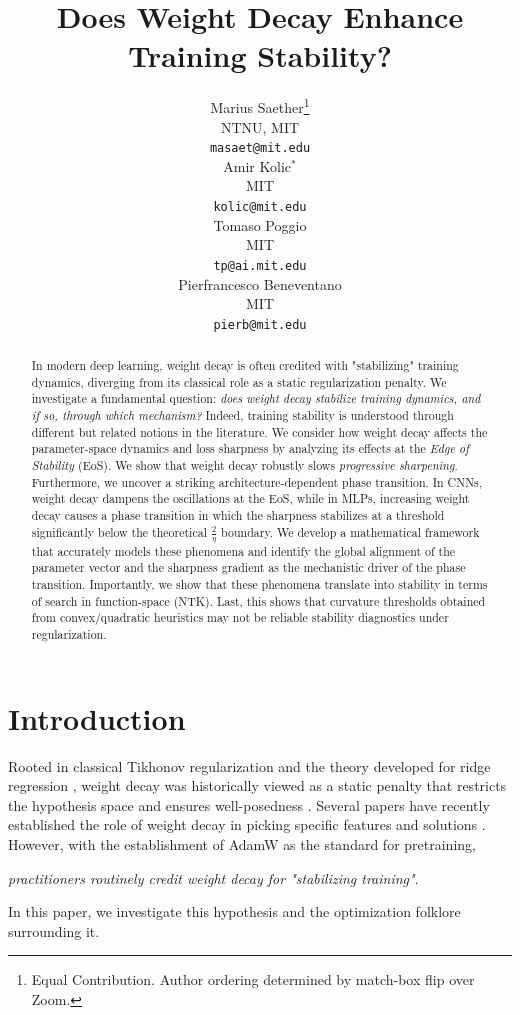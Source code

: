 \documentclass{article}
\title{Does Weight Decay Enhance Training Stability?}
\author{%
  Marius Saether\thanks{Equal Contribution. Author ordering determined by match-box flip over Zoom.}\\
  NTNU, MIT\\
  \texttt{masaet@mit.edu}\\
  \And
  Amir Kolic$^*$\\
  MIT\\
  \texttt{kolic@mit.edu}\\
  \And
  Tomaso Poggio \\
  MIT\\
  \texttt{tp@ai.mit.edu}\\
  \And
  Pierfrancesco Beneventano\\
  MIT\\
  \texttt{pierb@mit.edu}\\
}
\begin{document}
\maketitle

\begin{abstract}
In modern deep learning, weight decay is often credited with "stabilizing" training dynamics, diverging from its classical role as a static regularization penalty. We investigate a fundamental question: \emph{does weight decay stabilize training dynamics, and if so, through which mechanism?} Indeed, training stability is understood through different but related notions in the literature. We consider how weight decay affects the parameter-space dynamics and loss sharpness by analyzing its effects at the \emph{Edge of Stability} (EoS). We show that weight decay robustly slows \emph{progressive sharpening}. Furthermore, we uncover a striking architecture-dependent phase transition. In CNNs, weight decay dampens the oscillations at the EoS, while in MLPs, increasing weight decay causes a phase transition in which the sharpness stabilizes at a threshold significantly below the theoretical $\frac{2}{\eta}$ boundary. We develop a mathematical framework that accurately models these phenomena and identify the global alignment of the parameter vector and the sharpness gradient as the mechanistic driver of the phase transition. Importantly, we show that these phenomena translate into stability in terms of search in function-space (NTK). Last, this shows that curvature thresholds obtained from convex/quadratic heuristics may not be reliable stability diagnostics under regularization.
\end{abstract}

\section{Introduction}
\label{sec:introduction}
Rooted in classical Tikhonov regularization \citep{tikhonov} and the theory developed for ridge regression \citep{hoerl}, weight decay was historically viewed as a static penalty that restricts the hypothesis space and ensures well-posedness \citep{hanson, krogh}. Several papers have recently established the role of weight decay in picking specific features and solutions \citep{soudry, beneventano_implicit, jacobs, galanti, chen_lowrank, zangrando, yunis}. However, with the establishment of AdamW \citep{loshchilov} as the standard for pretraining, 
\begin{center}
    \textit{practitioners routinely credit weight decay for "stabilizing training"}.
\end{center}
In this paper, we investigate this hypothesis and the optimization folklore surrounding it.
\end{document}
